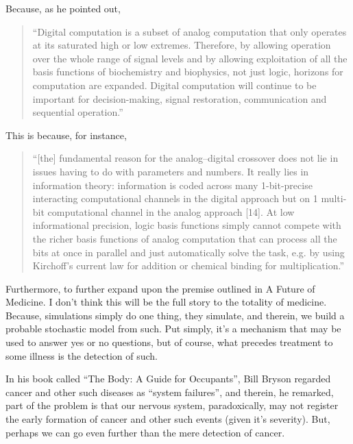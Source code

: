 Because, as he pointed out,

\begin{quotation}
    ``Digital computation is a subset of analog computation that only operates at its saturated high or low extremes. Therefore, by allowing operation over the whole range of signal levels and by allowing exploitation of all the basis functions of biochemistry and biophysics, not just logic, horizons for computation are expanded. Digital computation will continue to be important for decision-making, signal restoration, communication and sequential operation.''
\end{quotation}

This is because, for instance, \begin{quotation}
    ``[the] fundamental reason for the analog–digital crossover does not lie in issues having to do with parameters and numbers. It really lies in information theory: information is coded across many 1-bit-precise interacting computational channels in the digital approach but on 1 multi-bit computational channel in the analog approach [14]. At low informational precision, logic basis functions simply cannot compete with the richer basis functions of analog computation that can process all the bits at once in parallel and just automatically solve the task, e.g. by using Kirchoff’s current law for addition or chemical binding for multiplication.''
\end{quotation}

Furthermore, to further expand upon the premise outlined in A Future of Medicine. I don't think this will be the full story to the totality of medicine. Because, simulations simply do one thing, they simulate, and therein, we build a probable stochastic model from such. Put simply, it's a mechanism that may be used to answer yes or no questions, but of course, what precedes treatment to some illness is the detection of such. 

In his book called ``The Body: A Guide for Occupants'', Bill Bryson regarded cancer and other such diseases as ``system failures'', and therein, he remarked, part of the problem is that our nervous system, paradoxically, may not register the early formation of cancer and other such events (given it's severity). But, perhaps we can go even further than the mere detection of cancer.

